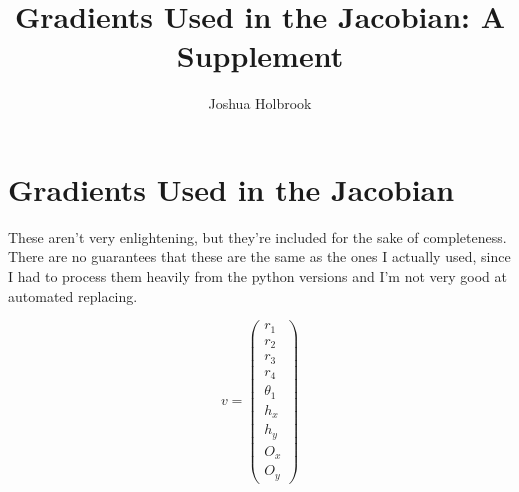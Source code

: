 \documentclass[10pt]{article}
\begin{document}
\title{Gradients Used in the Jacobian: A Supplement}
\author{Joshua Holbrook}
\section*{Gradients Used in the Jacobian}

These aren't very enlightening, but they're included for the sake of completeness.  There are no guarantees that these are the same as the ones I actually used, since I had to process them heavily from the python versions and I'm not very good at automated replacing.

\[v=\begin{pmatrix}r_1\\r_2\\r_3\\r_4\\\theta_1\\h_x\\h_y\\O_x\\O_y\end{pmatrix}\]
\end{document}
